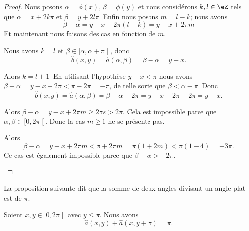 \begin{proof}
	Nous posons \( \alpha=\phi(x)\), \( \beta=\phi(y)\) et nous considérons \( k,l\in \eZ\) tels que \( \alpha=x+2k\pi\) et \( \beta=y+2l\pi\). Enfin nous posons \( m=l-k\); nous avons
	\begin{equation}
		\beta-\alpha=y-x+2\pi(l-k)=y-x+2\pi m
	\end{equation}
	Et maintenant nous faisons des cas en fonction de \( m\).
	\begin{subproof}
		\spitem[Si \( m=0\)]
		Nous avons \( k=l\) et \( \beta\in \mathopen[ \alpha,\alpha+\pi\mathclose[\), donc
		\begin{equation}
			\hat b(x,y)  =\hat a(\alpha,\beta)
			=\beta-\alpha
			=y-x.
		\end{equation}

		\spitem[Si \( m=-1\)]
		Alors \( k=l+1\). En utilisant l'hypothèse \( y-x<\pi\) nous avons \( \beta-\alpha=y-x-2\pi<\pi-2\pi=-\pi\), de telle sorte que \( \beta<\alpha-\pi\). Donc
		\begin{equation}
			\hat b(x,y)=	\hat a(\alpha,\beta)=\beta-\alpha+2\pi=y-x-2\pi+2\pi=y-x.
		\end{equation}

		\spitem[Si \( m\geq 1\)]
		Alors \( \beta-\alpha=y-x+2\pi m\geq 2\pi s>2\pi\). Cela est impossible parce que \( \alpha,\beta\in \mathopen[ 0,2\pi\mathclose[\). Donc la cas \( m\geq 1\) ne se présente pas.

		\spitem[Si \( m\leq -2\)]
		Alors
		\begin{equation}
			\beta-\alpha=y-x+2\pi m<\pi+2\pi m=\pi(1+2m)<\pi(1-4)=-3\pi.
		\end{equation}
		Ce cas est également impossible parce que \( \beta-\alpha>-2\pi\).
	\end{subproof}
\end{proof}

La proposition suivante dit que la somme de deux angles divisant un angle plat est de \( \pi\).
\begin{proposition}	\label{PROPooCOFQooNYPTpV}
	Soient \( x,y\in \mathopen[ 0,2\pi\mathclose[\) avec \( y\leq \pi\). Nous avons
	\begin{equation}
		\hat a(x,y)+\hat a(x,y+\pi)=\pi.
	\end{equation}
\end{proposition}

